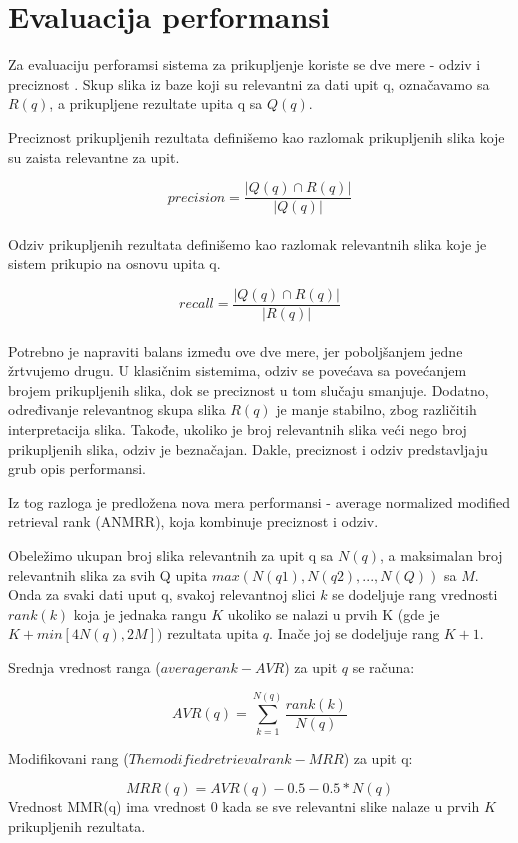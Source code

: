 \documentclass{article}
\begin{document}
\section{Evaluacija performansi}
Za evaluaciju perforamsi sistema za prikupljenje koriste se dve mere
- odziv i preciznost \cite{smeulders2000content}. Skup slika iz baze koji su relevantni za dati upit q, označavamo sa $R(q)$, a prikupljene rezultate upita q sa $Q(q)$.

Preciznost prikupljenih rezultata definišemo kao razlomak prikupljenih slika koje su zaista relevantne za upit.

$$precision = \frac{ |Q(q) \cap R(q)|}{|Q(q)|}$$ \\

Odziv prikupljenih rezultata definišemo kao razlomak relevantnih slika koje je sistem prikupio na osnovu upita q.

$$recall = \frac{ |Q(q) \cap R(q)|}{|R(q)|}$$ \\

Potrebno je napraviti balans između ove dve mere, jer poboljšanjem jedne žrtvujemo drugu. U klasičnim sistemima, odziv se povećava sa povećanjem brojem prikupljenih slika, dok se preciznost u tom slučaju smanjuje. Dodatno, određivanje relevantnog skupa slika $R(q)$ je manje stabilno, zbog različitih interpretacija slika. Takođe, ukoliko je broj relevantnih slika veći nego broj prikupljenih slika, odziv je beznačajan. Dakle, preciznost i odziv predstavljaju grub opis performansi.

Iz tog razloga je predložena nova mera performansi - average normalized modified retrieval rank (ANMRR), koja kombinuje preciznost i odziv. 

Obeležimo ukupan broj slika relevantnih za upit q sa $N(q)$, a maksimalan broj relevantnih slika za svih Q upita  $ max(N(q1), N(q2), ..., N(Q)) $ sa $M$.
Onda za svaki dati uput q, svakoj relevantnoj slici $k$ se dodeljuje rang vrednosti $rank(k)$ koja je jednaka rangu $K$ ukoliko se nalazi u prvih K (gde je $K + min[4N(q), 2M])$ rezultata upita $q$. Inače joj se dodeljuje rang $K+1$.

Srednja vrednost ranga ($average rank - AVR$) za upit $q$ se računa: 

$$ AVR(q) = \sum_{k=1}^{N(q)} {\frac{rank(k)}{N(q)}}$$

Modifikovani rang ($The modified retrieval rank - MRR$) za upit q:

$$ MRR(q) = AVR(q) - 0.5 - 0.5*N(q)$$
Vrednost MMR(q) ima vrednost 0 kada se sve relevantni slike nalaze u prvih $K$ prikupljenih rezultata.
\end{document}
